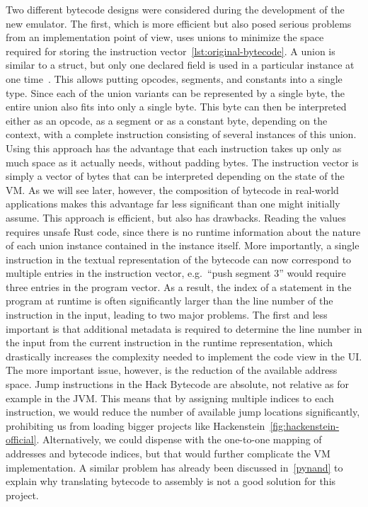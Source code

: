Two different bytecode designs were considered during the development of the new emulator.
The first, which is more efficient but also posed serious problems from an implementation point of view, uses unions to minimize the space required for storing the instruction vector~\ref{lst:original-bytecode}.
A union is similar to a struct, but only one declared field is used in a particular instance at one time~\cite{klabnik2019rust}.
This allows putting opcodes, segments, and constants into a single type.
Since each of the union variants can be represented by a single byte, the entire union also fits into only a single byte.
This byte can then be interpreted either as an opcode, as a segment or as a constant byte, depending on the context, with a complete instruction consisting of several instances of this union.
Using this approach has the advantage that each instruction takes up only as much space as it actually needs, without padding bytes.
The instruction vector is simply a vector of bytes that can be interpreted depending on the state of the VM.
As we will see later, however, the composition of bytecode in real-world applications makes this advantage far less significant than one might initially assume.
This approach is efficient, but also has drawbacks.
Reading the values requires unsafe Rust code, since there is no runtime information about the nature of each union instance contained in the instance itself.
More importantly, a single instruction in the textual representation of the bytecode can now correspond to multiple entries in the instruction vector, e.g.\ ``push segment 3'' would require three entries in the program vector.
As a result, the index of a statement in the program at runtime is often significantly larger than the line number of the instruction in the input, leading to two major problems.
The first and less important is that additional metadata is required to determine the line number in the input from the current instruction in the runtime representation, which drastically increases the complexity needed to implement the code view in the UI.
The more important issue, however, is the reduction of the available address space.
Jump instructions in the Hack Bytecode are absolute, not relative as for example in the JVM.
This means that by assigning multiple indices to each instruction, we would reduce the number of available jump locations significantly, prohibiting us from loading bigger projects like Hackenstein~\ref{fig:hackenstein-official}.
Alternatively, we could dispense with the one-to-one mapping of addresses and bytecode indices, but that would further complicate the VM implementation.
A similar problem has already been discussed in~\cref{pynand} to explain why translating bytecode to assembly is not a good solution for this project.

